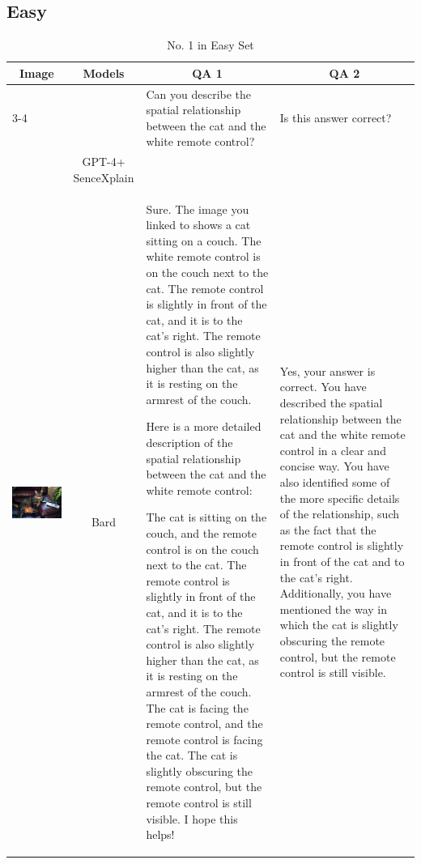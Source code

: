 \documentclass[journal,10pt]{IEEEtran}
\begin{document}
\onecolumn
\subsection{Easy}

\begin{table}[htbp]
    \centering
    \caption{No. 1 in Easy Set}
    \label{tab:easy1}
    \begin{tabular}{|l|c|p{5cm}|p{5cm}|} 
    \toprule
    \multicolumn{1}{|c|}{\multirow{2}{*}{Image}} & \multirow{2}{*}{Models} & \multicolumn{1}{c|}{QA 1}                                                            & \multicolumn{1}{c|}{QA 2}  \\ 
    \cline{3-4}
    \multicolumn{1}{|c|}{}                       &                         & Can you describe the spatial relationship between the cat and the white remote control? & Is this answer correct?    \\ 
    \hline
    \multirow{3}{*}{\includegraphics[width=0.25\linewidth]{../image set/easy/000000000599.jpg}}                            & GPT-4+ SenceXplain      &                                                                                      &                            \\ 
    \cline{2-4}
                                                 & Bard                    &      
                                                 
Sure. The image you linked to shows a cat sitting on a couch. The white remote control is on the couch next to the cat. The remote control is slightly in front of the cat, and it is to the cat's right. The remote control is also slightly higher than the cat, as it is resting on the armrest of the couch.

Here is a more detailed description of the spatial relationship between the cat and the white remote control:

The cat is sitting on the couch, and the remote control is on the couch next to the cat.
The remote control is slightly in front of the cat, and it is to the cat's right.
The remote control is also slightly higher than the cat, as it is resting on the armrest of the couch.
The cat is facing the remote control, and the remote control is facing the cat.
The cat is slightly obscuring the remote control, but the remote control is still visible.
I hope this helps!                                                                              &   
Yes, your answer is correct. You have described the spatial relationship between the cat and the white remote control in a clear and concise way. You have also identified some of the more specific details of the relationship, such as the fact that the remote control is slightly in front of the cat and to the cat's right. Additionally, you have mentioned the way in which the cat is slightly obscuring the remote control, but the remote control is still visible.


\end{tabular}
\end{table}
\end{document}
